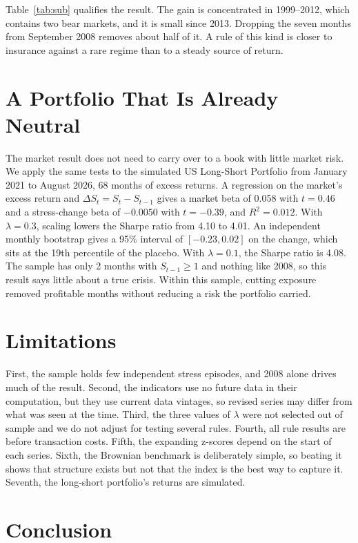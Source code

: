 \documentclass[10pt,twocolumn,letterpaper]{article}
\begin{document}
Table~\ref{tab:sub} qualifies the result. The gain is concentrated in 1999--2012, which contains two bear markets, and it is small since 2013. Dropping the seven months from September 2008 removes about half of it. A rule of this kind is closer to insurance against a rare regime than to a steady source of return.

\section{A Portfolio That Is Already Neutral}

The market result does not need to carry over to a book with little market risk. We apply the same tests to the simulated US Long-Short Portfolio from January 2021 to August 2026, 68 months of excess returns. A regression on the market's excess return and $\Delta S_t = S_t - S_{t-1}$ gives a market beta of 0.058 with $t = 0.46$ and a stress-change beta of $-0.0050$ with $t = -0.39$, and $R^2 = 0.012$. With $\lambda = 0.3$, scaling lowers the Sharpe ratio from 4.10 to 4.01. An independent monthly bootstrap gives a 95\% interval of $[-0.23, 0.02]$ on the change, which sits at the 19th percentile of the placebo. With $\lambda = 0.1$, the Sharpe ratio is 4.08. The sample has only 2 months with $S_{t-1} \ge 1$ and nothing like 2008, so this result says little about a true crisis. Within this sample, cutting exposure removed profitable months without reducing a risk the portfolio carried.

\section{Limitations}

First, the sample holds few independent stress episodes, and 2008 alone drives much of the result. Second, the indicators use no future data in their computation, but they use current data vintages, so revised series may differ from what was seen at the time. Third, the three values of $\lambda$ were not selected out of sample and we do not adjust for testing several rules. Fourth, all rule results are before transaction costs. Fifth, the expanding z-scores depend on the start of each series. Sixth, the Brownian benchmark is deliberately simple, so beating it shows that structure exists but not that the index is the best way to capture it. Seventh, the long-short portfolio's returns are simulated.

\section{Conclusion}
\end{document}
